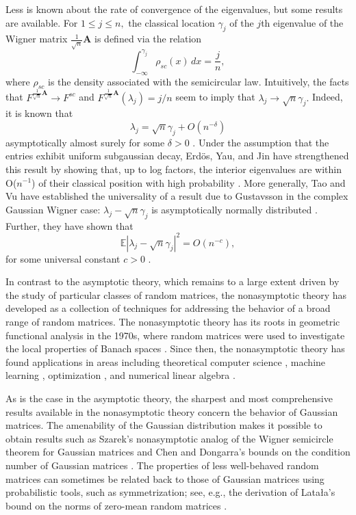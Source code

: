 \documentclass[11pt,letterpaper,twoside,reqno,nosumlimits]{amsart}
\newcommand{\mat}[1]{\ensuremath{\bm{#1}}} %
\newcommand{\E}{\ensuremath{\mathbb{E}}}
\theoremstyle{remark}
\numberwithin{equation}{section}
\numberwithin{thm}{section}
\numberwithin{prop}{section}
\numberwithin{defn}{section}
\numberwithin{remark}{section}
\begin{document}
Less is known about the rate of convergence of the eigenvalues, but some results are available. For $1 \leq j \leq n,$ the classical location $\gamma_j$ of the $j$th eigenvalue of the Wigner matrix $\frac{1}{\sqrt{n}} \mat{A}$ is defined via the relation
\[
\int_{-\infty}^{\gamma_j} \rho_{sc}(x) \, dx = \frac{j}{n},
\]
where $\rho_{sc}$ is the density associated with the semicircular law. Intuitively, the facts that $F^{\frac{1}{\sqrt{n}}\mat{A}} \rightarrow F^{sc}$ and $F^{\frac{1}{\sqrt{n}}\mat{A}}(\lambda_j) = j/n$ seem to imply that $\lambda_j \rightarrow \sqrt{n}\gamma_j.$ Indeed, it is known that 
\[
\lambda_j = \sqrt{n} \gamma_j + O(n^{-\delta})
\]
asymptotically almost surely for some $\delta > 0$ \cite{BY88a,BY88b}. Under the assumption that the entries exhibit uniform subgaussian decay, Erd\"os, Yau, and Jin have strengthened this result by showing that, up to log factors, the interior eigenvalues are within O($n^{-1}$) of their classical position with high probability \cite{ErdosYauYin10}. More generally, Tao and Vu have established the universality of a result due to Gustavsson \cite{Gustavsson05} in the complex Gaussian Wigner case: $\lambda_j - \sqrt{n} \gamma_j$ is asymptotically normally distributed \cite{TaoVu11}. Further, they have shown that
\[
\E |\lambda_j - \sqrt{n} \gamma_j|^2 = O(n^{-c}),
\]
for some universal constant $c >0$ \cite{TaoVu10}.

In contrast to the asymptotic theory, which remains to a large extent driven by the study of particular classes of random matrices, the nonasymptotic theory has developed as a collection of techniques for addressing the behavior of a broad range of random matrices. The nonasymptotic theory has its roots in geometric functional analysis in the 1970s, where random matrices were used to investigate the local properties of Banach spaces \cite{LindenstraussMilman93,DavidsonSzarek01,VershyninRMTnotes}. Since then, the nonasymptotic theory has found applications in areas including theoretical computer science \cite{Achlioptas03,Vempala04,SpielmanSrivastava08}, machine learning \cite{DM05}, optimization \cite{Nem07,So09}, and numerical linear algebra \cite{DM10,Halkoetal11,Mahoney11}. 

As is the case in the asymptotic theory, the sharpest and most comprehensive results available in the nonasymptotic theory concern the behavior of Gaussian matrices. The amenability of the Gaussian distribution makes it possible to obtain results such as Szarek's nonasymptotic analog of the Wigner semicircle theorem for Gaussian matrices \cite{Sza90} and Chen and Dongarra's bounds on the condition number of Gaussian matrices \cite{ChenDongarra05}.
The properties of less well-behaved random matrices can sometimes be related back to those of Gaussian matrices using probabilistic tools, such as symmetrization; see, e.g., the derivation of Lata{\l}a's bound on the norms of zero-mean random matrices \cite{Lat04}. 
\end{document}

